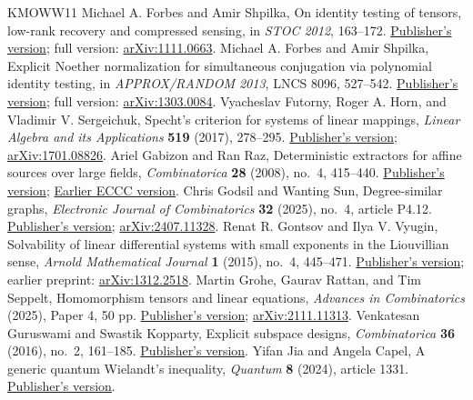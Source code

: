 \documentclass[11pt,letterpaper]{article}
\theoremstyle{definition}\newtheorem{definition}[theorem]{Definition}
\theoremstyle{remark}\newtheorem{remark}[theorem]{Remark}
\begin{document}
\begin{thebibliography}{KMOWW11}
 Michael A. Forbes and Amir Shpilka, On identity testing of tensors, low-rank recovery and compressed sensing, in \emph{STOC 2012}, 163--172. \href{https://doi.org/10.1145/2213977.2213995}{Publisher's version}; full version: \href{https://arxiv.org/abs/1111.0663}{arXiv:1111.0663}.
 Michael A. Forbes and Amir Shpilka, Explicit Noether normalization for simultaneous conjugation via polynomial identity testing, in \emph{APPROX/RANDOM 2013}, LNCS 8096, 527--542. \href{https://doi.org/10.1007/978-3-642-40328-6_37}{Publisher's version}; full version: \href{https://arxiv.org/abs/1303.0084}{arXiv:1303.0084}.
 Vyacheslav Futorny, Roger A. Horn, and Vladimir V. Sergeichuk, Specht's criterion for systems of linear mappings, \emph{Linear Algebra and its Applications} \textbf{519} (2017), 278--295. \href{https://doi.org/10.1016/j.laa.2017.01.006}{Publisher's version}; \href{https://arxiv.org/abs/1701.08826}{arXiv:1701.08826}.
 Ariel Gabizon and Ran Raz, Deterministic extractors for affine sources over large fields, \emph{Combinatorica} \textbf{28} (2008), no.~4, 415--440. \href{https://doi.org/10.1007/s00493-008-2259-3}{Publisher's version}; \href{https://eccc.weizmann.ac.il/report/2005/108/}{Earlier ECCC version}.
 Chris Godsil and Wanting Sun, Degree-similar graphs, \emph{Electronic Journal of Combinatorics} \textbf{32} (2025), no.~4, article P4.12. \href{https://doi.org/10.37236/13199}{Publisher's version}; \href{https://arxiv.org/abs/2407.11328}{arXiv:2407.11328}.
 Renat R. Gontsov and Ilya V. Vyugin, Solvability of linear differential systems with small exponents in the Liouvillian sense, \emph{Arnold Mathematical Journal} \textbf{1} (2015), no.~4, 445--471. \href{https://doi.org/10.1007/s40598-015-0032-4}{Publisher's version}; earlier preprint: \href{https://arxiv.org/abs/1312.2518}{arXiv:1312.2518}.
 Martin Grohe, Gaurav Rattan, and Tim Seppelt, Homomorphism tensors and linear equations, \emph{Advances in Combinatorics} (2025), Paper 4, 50 pp. \href{https://doi.org/10.19086/aic.2025.4}{Publisher's version}; \href{https://arxiv.org/abs/2111.11313}{arXiv:2111.11313}.
 Venkatesan Guruswami and Swastik Kopparty, Explicit subspace designs, \emph{Combinatorica} \textbf{36} (2016), no.~2, 161--185. \href{https://doi.org/10.1007/s00493-014-3169-1}{Publisher's version}.
 Yifan Jia and Angela Capel, A generic quantum Wielandt's inequality, \emph{Quantum} \textbf{8} (2024), article 1331. \href{https://doi.org/10.22331/q-2024-05-02-1331}{Publisher's version}.

\end{thebibliography}
\end{document}
